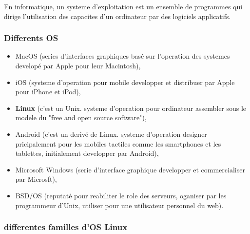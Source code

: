 En informatique, un systeme d'exploitation est un ensemble de programmes qui dirige l'utilisation des capacites d'un ordinateur par des logiciels applicatifs.\newline

\subsubsection{Differents OS}

\begin{itemize}
\item MacOS (series d'interfaces graphiques basé sur l'operation des systemes developé par Apple pour leur Macintosh),
\item iOS (systeme d'operation pour mobile developper et distribuer par Apple pour iPhone et iPod),
\item \textbf{Linux} (c'est un Unix. systeme d'operation pour ordinateur assembler sous le modele du "free and open source software"),
\item Android (c'est un derivé de Linux. systeme d'operation designer pricipalement pour les mobiles tactiles comme les smartphones et les tablettes, initialement developper par Android),
\item Microsoft Windows (serie d'interface graphique developper et commercialiser par Microsft),
\item BSD/OS (reputaté pour reabiliter le role des serveurs, oganiser par les programmeur d'Unix, utiliser pour une utilisateur personnel du web).\newline
\end{itemize}


\subsubsection{differentes familles d'OS Linux} 

